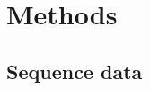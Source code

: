 \documentclass[11pt,oneside,letterpaper]{article}
\def\gdc#1{\textcolor{blue}{[#1]}}
\def\lmc#1{\textcolor{green}{[#1]}}
\begin{document}


\newpage

\section*{Methods}
\subsection*{Sequence data}
\end{document}
